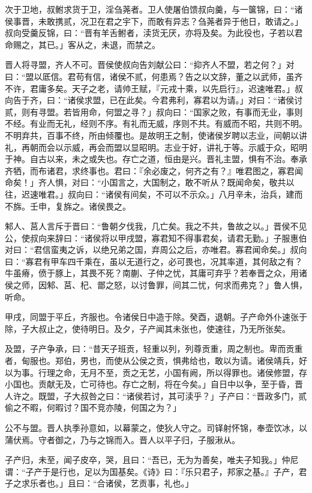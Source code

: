 \documentclass[]{article}
\begin{document}
次于卫地，叔鲋求货于卫，淫刍荛者。卫人使屠伯馈叔向羹，与一箧锦，曰：``诸侯事晋，未敢携贰，况卫在君之宇下，而敢有异志？刍荛者异于他日，敢请之。」叔向受羹反锦，曰：``晋有羊舌鲋者，渎货无厌，亦将及矣。为此役也，子若以君命赐之，其已。」客从之，未退，而禁之。

晋人将寻盟，齐人不可。晋侯使叔向告刘献公曰：``抑齐人不盟，若之何？」对曰：``盟以厎信。君苟有信，诸侯不贰，何患焉？告之以文辞，董之以武师，虽齐不许，君庸多矣。天子之老，请帅王赋，『元戎十乘，以先启行』，迟速唯君。」叔向告于齐，曰：``诸侯求盟，已在此矣。今君弗利，寡君以为请。」对曰：``诸侯讨贰，则有寻盟。若皆用命，何盟之寻？」叔向曰：``国家之败，有事而无业，事则不经。有业而无礼，经则不序。有礼而无威，序则不共。有威而不昭，共则不明。不明弃共，百事不终，所由倾覆也。是故明王之制，使诸侯岁聘以志业，间朝以讲礼，再朝而会以示威，再会而盟以显昭明。志业于好，讲礼于等。示威于众，昭明于神。自古以来，未之或失也。存亡之道，恒由是兴。晋礼主盟，惧有不治。奉承齐牺，而布诸君，求终事也。君曰：『余必废之，何齐之有？』唯君图之，寡君闻命矣！」齐人惧，对曰：``小国言之，大国制之，敢不听从？既闻命矣，敬共以往，迟速唯君。」叔向曰：``诸侯有间矣，不可以不示众。」八月辛未，治兵，建而不旆。壬申，复旆之。诸侯畏之。

邾人、莒人言斥于晋曰：``鲁朝夕伐我，几亡矣。我之不共，鲁故之以。」晋侯不见公，使叔向来辞曰：``诸侯将以甲戌盟，寡君知不得事君矣，请君无勤。」子服惠伯对曰：``君信蛮夷之诉，以绝兄弟之国，弃周公之后，亦唯君。寡君闻命矣。」叔向曰：``寡君有甲车四千乘在，虽以无道行之，必可畏也，况其率道，其何敌之有？牛虽瘠，偾于豚上，其畏不死？南蒯、子仲之忧，其庸可弃乎？若奉晋之众，用诸侯之师，因邾、莒、杞、鄫之怒，以讨鲁罪，间其二忧，何求而弗克？」鲁人惧，听命。

甲戌，同盟于平丘，齐服也。令诸侯日中造于除。癸酉，退朝。子产命外仆速张于除，子大叔止之，使待明日。及夕，子产闻其未张也，使速往，乃无所张矣。

及盟，子产争承，曰：``昔天子班贡，轻重以列，列尊贡重，周之制也。卑而贡重者，甸服也。郑伯，男也，而使从公侯之贡，惧弗给也，敢以为请。诸侯靖兵，好以为事。行理之命，无月不至，贡之无艺，小国有阙，所以得罪也。诸侯修盟，存小国也。贡献无及，亡可待也。存亡之制，将在今矣。」自日中以争，至于昏，晋人许之。既盟，子大叔咎之曰：``诸侯若讨，其可渎乎？」子产曰：``晋政多门，贰偷之不暇，何暇讨？国不竞亦陵，何国之为？」

公不与盟。晋人执季孙意如，以幕蒙之，使狄人守之。司铎射怀锦，奉壶饮冰，以蒲伏焉。守者御之，乃与之锦而入。晋人以平子归，子服湫从。

子产归，未至，闻子皮卒，哭，且曰：``吾已，无为为善矣，唯夫子知我。」仲尼谓：``子产于是行也，足以为国基矣。《诗》曰：『乐只君子，邦家之基。』子产，君子之求乐者也。」且曰：``合诸侯，艺贡事，礼也。」
\end{document}
